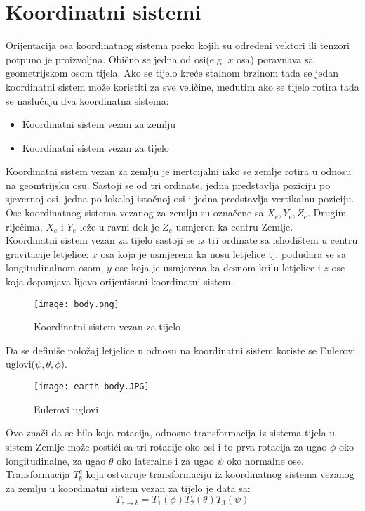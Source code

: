 \section{Koordinatni sistemi}
Orijentacija osa koordinatnog sistema preko kojih su određeni 
vektori ili tenzori potpuno je proizvoljna. Obično se jedna od osi(e.g. $x$ osa) poravnava 
sa geometrijskom osom tijela. 
Ako se tijelo kreće stalnom brzinom tada se jedan koordinatni sistem može 
koristiti za sve veličine, međutim ako se tijelo rotira tada se naslućuju dva koordinatna sistema:
\begin{itemize}
    \item Koordinatni sistem vezan za zemlju
    \item Koordinatni sistem vezan za tijelo
\end{itemize}
Koordinatni sistem vezan za zemlju je inertcijalni iako se zemlje rotira u odnosu na geomtrijsku osu.
Sastoji se od tri ordinate, jedna predstavlja poziciju po sjevernoj osi, jedna po lokaloj istočnoj osi 
i jedna predstavlja vertikalnu poziciju. Ose koordinatnog sistema vezanog za zemlju su 
označene sa $X_e, Y_e, Z_e$. Drugim riječima, $X_e$ i $Y_e$ leže u ravni dok je $Z_e$ usmjeren ka centru Zemlje.\\
Koordinatni sistem vezan za tijelo sastoji se iz tri ordinate sa ishodištem u centru gravitacije letjelice: $x$ osa koja je
usmjerena ka nosu letjelice tj. podudara se sa longitudinalnom osom, $y$ ose koja je usmjerena ka desnom krilu letjelice i $z$ ose koja dopunjava lijevo orijentisani 
koordinatni sistem.
\begin{figure}[!ht]
    \centering
    \texttt{[image: body.png]}
    \caption{Koordinatni sistem vezan za tijelo}
    \label{fig:KBS}
\end{figure}
Da se definiše položaj letjelice u odnosu na koordinatni sistem koriste se Eulerovi uglovi($\psi, \theta, \phi$).
\begin{figure}[!ht]
    \centering
    \texttt{[image: earth-body.JPG]}
    \caption{Eulerovi uglovi}
\end{figure}
Ovo znači da se bilo koja rotacija, odnosno transformacija iz sistema tijela u sistem Zemlje može postići sa tri rotacije oko osi i to prva 
rotacija za ugao $\phi$ oko longitudinalne, za ugao $\theta$ oko lateralne i za ugao 
$\psi$ oko normalne ose. Transformacija $T_b^e$ koja ostvaruje transformaciju iz 
koordinatnog sistema vezanog za zemlju u koordinatni sistem vezan za tijelo je data sa:
\begin{equation}
    T_{z \to b} = T_1(\phi)T_2(\theta)T_3(\psi)
\end{equation}
